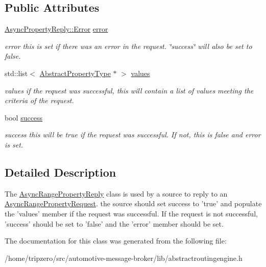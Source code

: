 \subsection*{Public Attributes}
\begin{DoxyCompactItemize}
\item 
\hypertarget{classAsyncRangePropertyReply_a43762c9a2d88ec91e3218f7eca297e56}{\hyperlink{classAsyncPropertyReply_ad91affaa25fcc3b73947a6cf4591e5d1}{Async\-Property\-Reply\-::\-Error} \hyperlink{classAsyncRangePropertyReply_a43762c9a2d88ec91e3218f7eca297e56}{error}}\label{classAsyncRangePropertyReply_a43762c9a2d88ec91e3218f7eca297e56}

\begin{DoxyCompactList}\small\item\em error this is set if there was an error in the request. \char`\"{}success\char`\"{} will also be set to false. \end{DoxyCompactList}\item 
\hypertarget{classAsyncRangePropertyReply_a4ce96fd40ce8ec3fddab46652026734b}{std\-::list$<$ \hyperlink{classAbstractPropertyType}{Abstract\-Property\-Type} $\ast$ $>$ \hyperlink{classAsyncRangePropertyReply_a4ce96fd40ce8ec3fddab46652026734b}{values}}\label{classAsyncRangePropertyReply_a4ce96fd40ce8ec3fddab46652026734b}

\begin{DoxyCompactList}\small\item\em values if the request was successful, this will contain a list of values meeting the criteria of the request. \end{DoxyCompactList}\item 
\hypertarget{classAsyncRangePropertyReply_a4eab37dada60970211e62b0fc3aeac92}{bool \hyperlink{classAsyncRangePropertyReply_a4eab37dada60970211e62b0fc3aeac92}{success}}\label{classAsyncRangePropertyReply_a4eab37dada60970211e62b0fc3aeac92}

\begin{DoxyCompactList}\small\item\em success this will be true if the request was successful. If not, this is false and error is set. \end{DoxyCompactList}\end{DoxyCompactItemize}


\subsection{Detailed Description}
The \hyperlink{classAsyncRangePropertyReply}{Async\-Range\-Property\-Reply} class is used by a source to reply to an \hyperlink{classAsyncRangePropertyRequest}{Async\-Range\-Property\-Request}. the source should set success to 'true' and populate the 'values' member if the request was successful. If the request is not successful, 'success' should be set to 'false' and the 'error' member should be set. 

The documentation for this class was generated from the following file\-:\begin{DoxyCompactItemize}
\item 
/home/tripzero/src/automotive-\/message-\/broker/lib/abstractroutingengine.\-h\end{DoxyCompactItemize}
